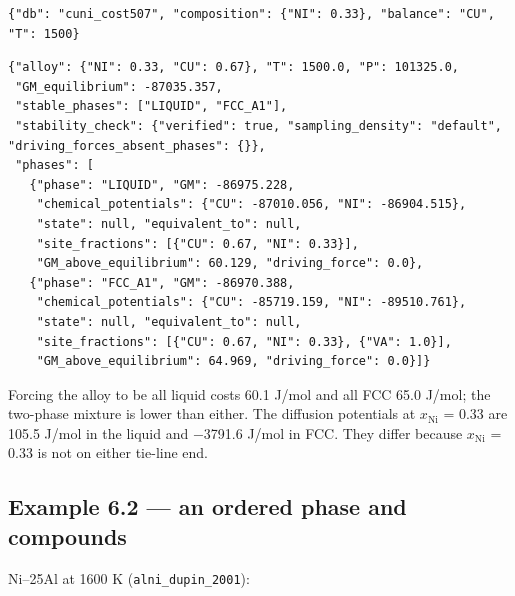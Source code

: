 \documentclass[12pt,a4paper]{article}
\begin{document}
\begin{lstlisting}[basicstyle={\footnotesize\ttfamily}]
{"db": "cuni_cost507", "composition": {"NI": 0.33}, "balance": "CU", "T": 1500}
\end{lstlisting}
\begin{lstlisting}[basicstyle={\scriptsize\ttfamily}]
{"alloy": {"NI": 0.33, "CU": 0.67}, "T": 1500.0, "P": 101325.0,
 "GM_equilibrium": -87035.357,
 "stable_phases": ["LIQUID", "FCC_A1"],
 "stability_check": {"verified": true, "sampling_density": "default", "driving_forces_absent_phases": {}},
 "phases": [
   {"phase": "LIQUID", "GM": -86975.228,
    "chemical_potentials": {"CU": -87010.056, "NI": -86904.515},
    "state": null, "equivalent_to": null,
    "site_fractions": [{"CU": 0.67, "NI": 0.33}],
    "GM_above_equilibrium": 60.129, "driving_force": 0.0},
   {"phase": "FCC_A1", "GM": -86970.388,
    "chemical_potentials": {"CU": -85719.159, "NI": -89510.761},
    "state": null, "equivalent_to": null,
    "site_fractions": [{"CU": 0.67, "NI": 0.33}, {"VA": 1.0}],
    "GM_above_equilibrium": 64.969, "driving_force": 0.0}]}
\end{lstlisting}
Forcing the alloy to be all liquid costs 60.1 J/mol and all FCC 65.0 J/mol; the two-phase mixture is lower than either. The diffusion potentials at \(x_{\mathrm{Ni}}\) = 0.33 are 105.5 J/mol in the liquid and \(-\)3791.6 J/mol in FCC. They differ because \(x_{\mathrm{Ni}}\) = 0.33 is not on either tie-line end.


\subsection*{Example 6.2 --- an ordered phase and compounds}
Ni--25Al at 1600 K (\texttt{alni\_\allowbreak{}dupin\_\allowbreak{}2001}):
\end{document}
